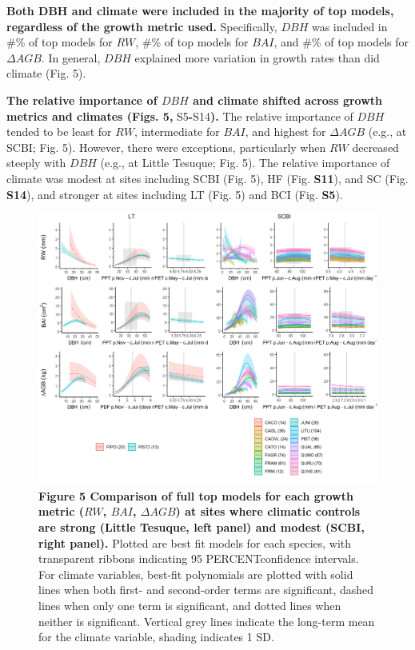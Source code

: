 \documentclass[
]{article}
\begin{document}
\textbf{Both DBH and climate were included in the majority of top
models, regardless of the growth metric used.} Specifically, \(DBH\) was
included in \#\% of top models for \(RW\), \#\% of top models for
\(BAI\), and \#\% of top models for \(\Delta AGB\). In general, \(DBH\)
explained more variation in growth rates than did climate (Fig. 5).

\textbf{The relative importance of \(DBH\) and climate shifted across
growth metrics and climates (Figs. 5, }S5\textbf{-}S14\textbf{).} The
relative importance of \(DBH\) tended to be least for \(RW\),
intermediate for \(BAI\), and highest for \(\Delta AGB\) (e.g., at SCBI;
Fig. 5). However, there were exceptions, particularly when \(RW\)
decreased steeply with \(DBH\) (e.g., at Little Tesuque; Fig. 5). The
relative importance of climate was modest at sites including SCBI (Fig.
5), HF (Fig. \textbf{S11}), and SC (Fig. \textbf{S14}), and stronger at
sites including LT (Fig. 5) and BCI (Fig. \textbf{S5}).

\begin{figure}
\centering
\includegraphics{tables_figures/show_case_response_plots.png}
\caption{\textbf{Figure 5 \textbar{} Comparison of full top models for
each growth metric (\(RW\), \(BAI\), \(\Delta AGB\)) at sites where
climatic controls are strong (Little Tesuque, left panel) and modest
(SCBI, right panel).} Plotted are best fit models for each species, with
transparent ribbons indicating 95 PERCENTconfidence intervals. For
climate variables, best-fit polynomials are plotted with solid lines
when both first- and second-order terms are significant, dashed lines
when only one term is significant, and dotted lines when neither is
significant. Vertical grey lines indicate the long-term mean for the
climate variable, shading indicates 1 SD.}
\end{figure}
\end{document}
